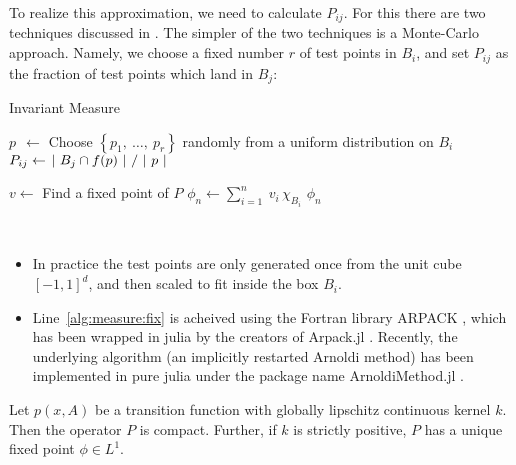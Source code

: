 To realize this approximation, we need to calculate $P_{ij}$. For this there are two 
techniques discussed in \cite*{algGAIO}. The simpler of the two techniques is a 
Monte-Carlo approach. Namely, we choose a fixed number $r$ of test points in 
$B_i$, and set $P_{ij}$ as the fraction of test points which land in $B_j$:

\begin{algorithm}
    \caption{Invariant Measure}
    \label{alg:measure}
    \begin{spacing}{1.2}
        \begin{algorithmic}[1]

                \State $p\ \ \gets $ Choose $\left\{ p_1,\ \ldots,\ p_r \right\}$ randomly from a uniform distribution on $B_i$
                \State $P_{ij} \gets \left. |\ B_j \cap f(p)\ | \ \middle/\ |\ p\ | \right.$
            \EndFor
    
            \State $v \gets $ Find a fixed point of $P$
            \label{alg:measure:fix}
            \State $\phi_n \gets \sum_{i=1}^n\: v_i\, \chi_{B_i}$
            \State \Return $\phi_n$
        \end{algorithmic}
    \end{spacing}
\end{algorithm}

\begin{remark}\ 
    \begin{itemize}
        \item In practice the test points are only generated once from the unit cube $[-1,1]^d$, 
        and then scaled to fit inside the box $B_i$.
        \item Line~\ref{alg:measure:fix} is acheived using the Fortran library ARPACK \cite*{ARPACK}, 
        which has been wrapped in julia by the creators of Arpack.jl \cite*{Arpack.jl}. Recently, the 
        underlying algorithm (an implicitly restarted Arnoldi method) has been 
        implemented in pure julia under the package name ArnoldiMethod.jl \cite*{ArnoldiMethod.jl}. \\
    \end{itemize}
\end{remark}

\begin{proposition}
    \cite*{lasota}
    Let $p(x, A)$ be a transition function with globally lipschitz continuous kernel $k$. 
    Then the operator $P$ is compact. Further, if $k$ is strictly positive, $P$ has
    a unique fixed point $\phi \in L^1$. 
\end{proposition}

